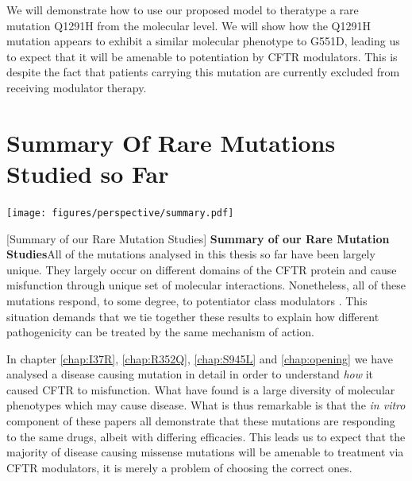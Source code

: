 We will demonstrate how to use our proposed model to theratype a rare mutation Q1291H from the molecular level. We will show how the Q1291H mutation appears to exhibit a similar molecular phenotype to G551D, leading us to expect that it will be amenable to potentiation by CFTR modulators. This is despite the fact that patients carrying this mutation are currently excluded from receiving modulator therapy. 



\section{Summary Of Rare Mutations Studied so Far}

	\begin{center}
		\texttt{[image: figures/perspective/summary.pdf]}
	\end{center}
\begingroup
\captionsetup{singlelinecheck = false, justification=raggedright}
[Summary of our Rare Mutation Studies] {\textbf{Summary of our Rare Mutation Studies}}{All of the mutations analysed in this thesis so far have been largely unique. They largely occur on different domains of the CFTR protein and cause misfunction through unique set of molecular interactions. Nonetheless, all of these mutations respond, to some degree, to potentiator class modulators \cite{wong2022, wong2022a, kim2018, vanwilligen2019}. This situation demands that we tie together these results to explain how different pathogenicity can be treated by the same mechanism of action. } 
\endgroup

In chapter \ref{chap:I37R}, \ref{chap:R352Q}, \ref{chap:S945L} and \ref{chap:opening} we have analysed a disease causing mutation in detail in order to understand \textit{how} it caused CFTR to misfunction. What have found is a large diversity of molecular phenotypes which may cause disease. What is thus remarkable is that the \textit{in vitro} component of these papers all demonstrate that these mutations are responding to the same drugs, albeit with differing efficacies. This leads us to expect that the majority of disease causing missense mutations will be amenable to treatment via CFTR modulators, it is merely a problem of choosing the correct ones.

